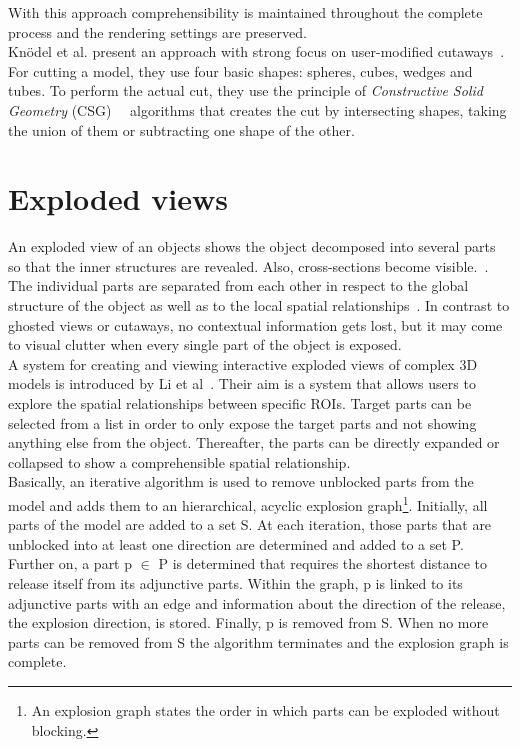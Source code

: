With this approach comprehensibility is maintained throughout the complete process and the rendering settings are preserved.\\
\newline
Kn{\"o}del et al. present an approach with strong focus on user-modified cutaways~\cite{incoll:cutawayIllustration}. For cutting a model, they use four basic shapes: spheres, cubes, wedges and tubes. To perform the actual cut, they use the principle of \emph{Constructive Solid Geometry} (CSG)~\cite{book:computerGraphicsHearn}~\cite{book:computerGraphicsHill} algorithms that creates the cut by intersecting shapes, taking the union of them or subtracting one shape of the other.\\

\section{Exploded views}
An exploded view of an objects shows the object decomposed into several parts so that the inner structures are revealed. Also, cross-sections become visible.~\cite{jour:explodedView}. The individual parts are separated from each other in respect to the global structure of the object as well as to the local spatial relationships~\cite{jour:generationExplodedView}. In contrast to ghosted views or cutaways, no contextual information gets lost, but it may come to visual clutter when every single part of the object is exposed.\\
\newline
A system for creating and viewing interactive exploded views of complex 3D models is introduced by Li et al~\cite{jour:generationExplodedView}. Their aim is a system that allows users to explore the spatial relationships between specific ROIs. Target parts can be selected from a list in order to only expose the target parts and not showing anything else from the object. Thereafter, the parts can be directly expanded or collapsed to show a comprehensible spatial relationship.\\
Basically, an iterative algorithm is used to remove unblocked parts from the model and adds them to an hierarchical, acyclic explosion graph\footnote{An explosion graph states the order in which parts can be exploded without blocking.}. Initially, all parts of the model are added to a set S. At each iteration, those parts that are unblocked into at least one direction are determined and added to a set P. Further on, a part p $\in$ P is determined that requires the shortest distance to release itself from its adjunctive parts. Within the graph, p is linked to its adjunctive parts with an edge and information about the direction of the release, the explosion direction, is stored. Finally, p is removed from S. When no more parts can be removed from S the algorithm terminates and the explosion graph is complete.\\
